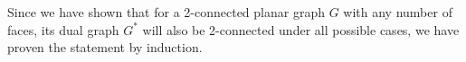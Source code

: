 \documentclass[11pt]{article}
\begin{document}
%
%
%
%
%
%
%

Since we have shown that for a 2-connected planar graph $G$ with any number of faces, its dual graph $G^*$ will also be 2-connected under all possible cases, we have proven the statement by induction.





%
% 
% 
\end{document}
